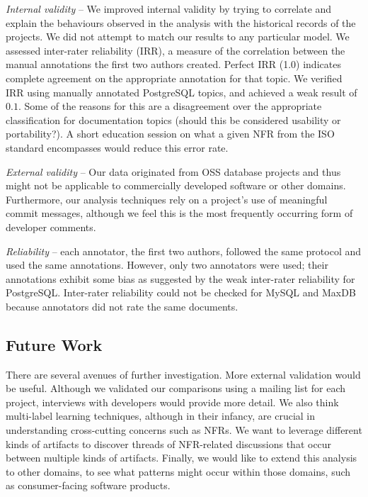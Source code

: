 \documentclass[smallextended]{svjour3}       %
\begin{document}
\emph{Internal validity} -- %
We improved internal validity by trying to correlate and explain the behaviours observed in the analysis with the historical records of the projects.
We did not attempt to match our results to any particular model.
We assessed inter-rater reliability (IRR), a measure of the correlation between the manual annotations the first two authors created. Perfect IRR (1.0) indicates complete agreement 
on the appropriate annotation for that topic. We verified IRR using
manually annotated PostgreSQL topics, and achieved a weak result of $0.1$.
Some of the reasons for this are a disagreement over the appropriate classification for documentation topics (should this be considered
usability or portability?). A short education session on what a given NFR from the ISO standard encompasses would reduce this error rate.

\emph{External validity} -- %
Our data originated from OSS database projects and thus might not be applicable to commercially developed software or other domains. 
Furthermore, our analysis techniques rely on a project's use of meaningful commit messages, although we feel this is the most frequently occurring form
of developer comments. 


\emph{Reliability} -- each annotator, the first two authors, followed the same protocol and used the same annotations. 
However, only two annotators were used; their annotations exhibit some
bias as suggested by the weak inter-rater reliability for
PostgreSQL. Inter-rater reliability could not be checked for MySQL and
MaxDB because annotators did not rate the same documents.

\subsection{Future Work}
There are several avenues of further investigation.  
More external validation would be useful. 
Although we validated our comparisons using a mailing list for each project, interviews with developers would provide more detail. 
We also think multi-label learning techniques, although in their infancy, are crucial in understanding cross-cutting concerns such as NFRs. 
We want to leverage different kinds of artifacts to discover threads of NFR-related discussions that occur between multiple kinds of artifacts.
Finally, we would like to extend this analysis to other domains, to
see what patterns might occur within those domains, such as consumer-facing software products.
\end{document}
